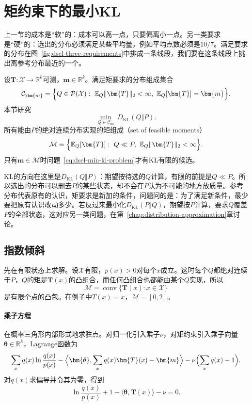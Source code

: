 \section{矩约束下的最小KL}
\label{sec:dsel-min-kl}

上一节的成本是“软”的：成本可以高一点，只要偏离小一点。另一类要求是“硬”的：选出的分布必须满足某些平均量，例如平均点数必须是$10/7$。满足要求的分布在图~\ref{fig:dsel-three-requirements}中排成一条线段，我们要在这条线段上挑出离参考分布最近的一个。

设$\bm{T}:\mathcal{X}\to\mathbb{R}^{k}$可测，$\bm{m}\in\mathbb{R}^{k}$。满足矩要求的分布组成集合
\[
 \mathcal{C}_{\bm{m}}=\Bigl\{Q\in\mathcal{P}(\mathcal{X}):\ \mathbb{E}_{Q}\lVert\bm{T}\rVert_2<\infty,\ \mathbb{E}_{Q}[\bm{T}]=\bm{m}\Bigr\}.
\]
本节研究
\begin{equation}
 \min_{Q\in\mathcal{C}_{\bm{m}}}\ D_{\mathrm{KL}}(Q\Vert P) .
 \label{eq:dsel-min-kl-problem}
\end{equation}
所有能由$P$的绝对连续分布实现的矩组成（set of feasible moments）
\[
 \mathcal{M}=\Bigl\{\mathbb{E}_{Q}[\bm{T}]:\ Q\ll P,\ \mathbb{E}_{Q}\lVert\bm{T}\rVert_2<\infty\Bigr\}.
\]
只有$\bm{m}\in\mathcal{M}$时问题~\eqref{eq:dsel-min-kl-problem}才有KL有限的候选。

KL的方向在这里是$D_{\mathrm{KL}}(Q\Vert P)$：期望按待选的$Q$计算，有限的前提是$Q\ll P$。所以选出的分布可以删去$P$的某些状态，却不会在$P$认为不可能的地方放质量。参考分布代表原有的认识，矩要求是新加的条件，问题问的是：为了满足新条件，最少要把原有认识改动多少。若反过来最小化$D_{\mathrm{KL}}(P\Vert Q)$，期望按$P$计算，要求$Q$覆盖$P$的全部状态，这对应另一类问题，在第~\ref{chap:distribution-approximation}章讨论。

\subsection{指数倾斜}
\label{sec:dsel-tilt}

先在有限状态上求解。设$\mathcal{X}$有限，$p(x)>0$对每个$x$成立。这时每个$Q$都绝对连续于$P$，$Q$的矩是$\bm{T}(x)$的凸组合，而任何凸组合也都能由某个$Q$实现，所以
\[
 \mathcal{M}=\operatorname{conv}\{\bm{T}(x):x\in\mathcal{X}\}
\]
是有限个点的凸包。在例子中$T(x)=x$，$\mathcal{M}=[0,2]$。

\paragraph{乘子方程}
在概率三角形内部形式地求驻点。对归一化引入乘子$\nu$，对矩约束引入乘子向量$\bm{\theta}\in\mathbb{R}^{k}$，Lagrange函数为
\[
 \sum_xq(x)\ln\frac{q(x)}{p(x)}-\Bigl\langle\bm{\theta},\sum_xq(x)\bm{T}(x)-\bm{m}\Bigr\rangle-\nu\Bigl(\sum_xq(x)-1\Bigr).
\]
对$q(x)$求偏导并令其为零，得到
\[
 \ln\frac{q(x)}{p(x)}+1-\langle\bm{\theta},\bm{T}(x)\rangle-\nu=0 .
\]

